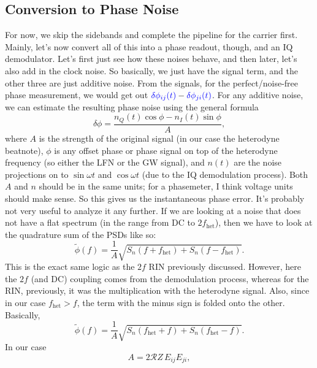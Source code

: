 \documentclass[11pt]{article}
\begin{document}
\subsection{Conversion to Phase Noise}
For now, we skip the sidebands and complete the pipeline for the carrier first. Mainly, let's now convert all of this into a phase readout, though, and an IQ demodulator. Let's first just see how these noises behave, and then later, let's also add in the clock noise. So basically, we just have the signal term, and the other three are just additive noise. From the signals, for the perfect/noise-free phase measurement, we would get out ${\color{blue}\delta\phi_{ij}(t)} - {\color{blue}\delta\phi_{ji}(t)}$. For any additive noise, we can estimate the resulting phase noise using the general formula
\begin{equation*}
    \delta \phi  = \frac{n_Q(t)\cos\phi - n_I(t)\sin\phi}{A},
\end{equation*}
where $A$ is the strength of the original signal (in our case the heterodyne beatnote), $\phi$ is any offset phase or phase signal on top of the heterodyne frequency (so either the LFN or the GW signal), and $n(t)$ are the noise projections on to $\sin\omega t$ and $\cos\omega t$ (due to the IQ demodulation process). Both $A$ and $n$ should be in the same units; for a phasemeter, I think voltage units should make sense. So this gives us the instantaneous phase error. It's probably not very useful to analyze it any further. If we are looking at a noise that does not have a flat spectrum (in the range from DC to $2f_{\text{het}}$), then we have to look at the quadrature sum of the PSDs like so:
\begin{equation*}
    \tilde{\phi}(f) = \frac{1}{A}\sqrt{S_n(f+f_{\text{het}})+S_n(f-f_{\text{het}})}.
\end{equation*}
This is the exact same logic as the $2f$ RIN previously discussed. However, here the $2f$ (and DC) coupling comes from the demodulation process, whereas for the RIN, previously, it was the multiplication with the heterodyne signal. Also, since in our case $f_{\text{het}} > f$, the term with the minus sign is folded onto the other. Basically,
\begin{equation} \label{toPhase}
    \tilde{\phi}(f) = \frac{1}{A}\sqrt{S_n(f_{\text{het}}+f)+S_n(f_{\text{het}}-f)}.
\end{equation}
In our case
\begin{equation*}
    A = 2\mathcal{R} Z \, E_{ij} E_{ji},
\end{equation*}
\end{document}
